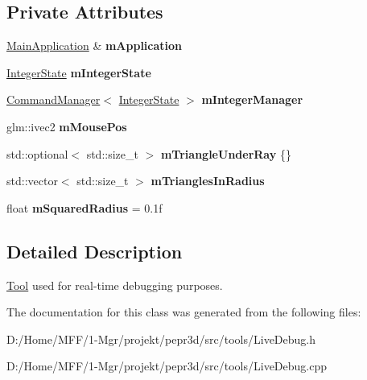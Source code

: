 \subsection*{Private Attributes}
\begin{DoxyCompactItemize}
\item 
\mbox{\label{classpepr3d_1_1_live_debug_a3ab9949aee36a0011886d7024d667608}} 
\mbox{\hyperlink{classpepr3d_1_1_main_application}{Main\+Application}} \& {\bfseries m\+Application}
\item 
\mbox{\label{classpepr3d_1_1_live_debug_a90845ed0b4390f47e4136d2ff173f740}} 
\mbox{\hyperlink{structpepr3d_1_1_integer_state}{Integer\+State}} {\bfseries m\+Integer\+State}
\item 
\mbox{\label{classpepr3d_1_1_live_debug_abd1c63025b81a3ecb4d261ae9ad74690}} 
\mbox{\hyperlink{classpepr3d_1_1_command_manager}{Command\+Manager}}$<$ \mbox{\hyperlink{structpepr3d_1_1_integer_state}{Integer\+State}} $>$ {\bfseries m\+Integer\+Manager}
\item 
\mbox{\label{classpepr3d_1_1_live_debug_a6066097404396581853e888df170969f}} 
glm\+::ivec2 {\bfseries m\+Mouse\+Pos}
\item 
\mbox{\label{classpepr3d_1_1_live_debug_a2e9c2ebd4834ed6d6ee27a30ea6216b7}} 
std\+::optional$<$ std\+::size\+\_\+t $>$ {\bfseries m\+Triangle\+Under\+Ray} \{\}
\item 
\mbox{\label{classpepr3d_1_1_live_debug_a9ccf555f71724262cf5f49ff8d765cab}} 
std\+::vector$<$ std\+::size\+\_\+t $>$ {\bfseries m\+Triangles\+In\+Radius}
\item 
\mbox{\label{classpepr3d_1_1_live_debug_a01d11e4cfd58c1805813133e9b761d59}} 
float {\bfseries m\+Squared\+Radius} = 0.\+1f
\end{DoxyCompactItemize}


\subsection{Detailed Description}
\mbox{\hyperlink{classpepr3d_1_1_tool}{Tool}} used for real-\/time debugging purposes. 

The documentation for this class was generated from the following files\+:\begin{DoxyCompactItemize}
\item 
D\+:/\+Home/\+M\+F\+F/1-\/\+Mgr/projekt/pepr3d/src/tools/Live\+Debug.\+h\item 
D\+:/\+Home/\+M\+F\+F/1-\/\+Mgr/projekt/pepr3d/src/tools/Live\+Debug.\+cpp\end{DoxyCompactItemize}
